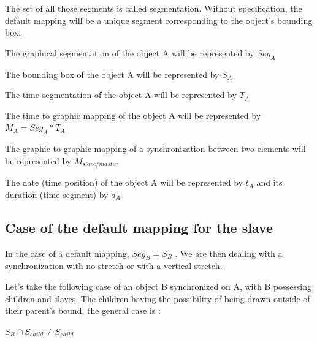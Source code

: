 \documentclass[a4paper]{article}
\begin{document}
The set of all those segments is called segmentation. Without specification, the default mapping will be a unique segment corresponding to the object's bounding box.

\bigskip

The graphical segmentation of the object A will be represented by $Seg_A$


The bounding box of the object A will be represented by $S_A$

The time segmentation of the object A will be represented by $T_A$

The time to graphic mapping of the object A will be represented by $M_A = Seg_A * T_A$

The graphic to graphic mapping of a synchronization between two elements will be represented by $M_{slave/master}$

The date (time position) of the object A will be represented by $t_A$ and its duration (time segment) by $d_A$




\subsection{Case of the default mapping for the slave}\label{subsec:defaultMap}

In the case of a default mapping, $Seg_B = S_B$ . We are then dealing with a synchronization with no stretch or with a vertical stretch. 

Let's take the following case of an object B synchronized on A, with B possessing children and slaves. 
The children having the possibility of being drawn outside of their parent's bound, the general case is : 
\begin{center} $S_B \cap S_{child} \neq S_{child}$ \end{center}

\bigskip
\end{document}
